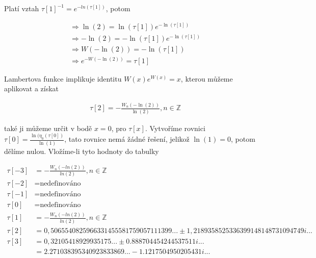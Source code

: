 Platí vztah \(\tau[1]^{-1}=e^{-ln(\tau[1])}\), potom

\begin{equation}
      \begin{aligned}
            &\Longrightarrow \ln(2)=\ln(\tau[1]) e^{-\ln(\tau[1])}\\
            &\Longrightarrow -\ln(2)=-\ln(\tau[1])e^{-\ln(\tau[1])} \\
            &\Longrightarrow W(-\ln(2))=-\ln(\tau[1]) \\
            &\Longrightarrow e^{-W(-\ln(2))}=\tau[1]
      \end{aligned}
      \label{8}
\end{equation}

Lambertova funkce implikuje identitu \(W(x) e^{W(x)}= x\), 
kterou můžeme aplikovat a získat 

\begin{equation}
      \begin{aligned}
            & \tau[2] = - \frac{W_n(-\ln(2))}{\ln(2)}, n \in \mathbb{Z}
      \end{aligned}
      \label{5}
\end{equation}

také ji můžeme určit v bodě \(x = 0\), pro \(\tau[x]\). Vytvoříme
rovnici \(\tau[0] = \frac{\ln(\eta_0(\tau[0])}{\ln(1)}\), tato rovnice
nemá žádné řešení, jelikož \(\ln(1) = 0\), potom dělíme nulou. Vložíme-li 
tyto hodnoty do tabulky

\begin{equation}
      \begin{aligned}
            \tau[-3] &= - \frac{W_n(-ln(2))}{ln(2)}, n \in \mathbb{Z}  \\
            \tau[-2] &= \mbox{nedefinováno} \\
            \tau[-1] &= \mbox{nedefinováno} \\
            \tau[0] &= \mbox{nedefinováno} \\
            \tau[1] &= - \frac{W_n(-ln(2))}{ln(2)}, n \in \mathbb{Z} \\
            \tau[2] &= 0,5065540825966331455581759057111399... \pm 
            1,2189358525336399148148731094749i... \\
            \tau[3] &= 0,32105418929935175... \pm 0.888704454244537511i... \\
            &= 2.271038395340923833869... - 1.1217504950205431i...
      \end{aligned}
\end{equation}

